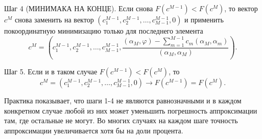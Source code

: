 \documentclass[a4paper, 12pt]{article}
\begin{document}
Шаг 4 (МИНИМАКА НА КОНЦЕ). Если снова $F\left(c^{M-1}\right)<F\left(c^M\right)$, то вектор $c^M$ снова заменить на вектор $\left(c^{M-1}_1,c^{M-1}_2,\dots ,c^{M-1}_{M-1},0\right)$ и применить покоординатную минимизацию только для последнего элемента
\begin{equation}c^M=\left(c^{M-1}_1,c^{M-1}_2,\dots ,c^{M-1}_{M-1},\frac{\left({\alpha }_M,\varphi \right)-\sum^{M-1}_{m=1}{c_m}\left({\alpha }_M,{\alpha }_m\right)}{\left({\alpha }_M,{\alpha }_M\right)}\right).\end{equation} 

Шаг 5. Если и в таком случае $F\left(c^{M-1}\right)<F\left(c^M\right)$, то 
\begin{equation}c^M=\left(c^{M-1}_1,c^{M-1}_2,\dots ,c^{M-1}_{M-1},0\right)\to F\left(c^{M-1}\right)=F\left(c^M\right).\end{equation} 

Практика показывает, что шаги 1-4 не являются равнозначными и в каждом конкретном случае любой из них может уменьшить погрешность аппроксимации там, где остальные не могут.
Во многих случаях на каждом шаге точность аппроксимации увеличивается хотя бы на доли процента.
\end{document}
